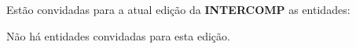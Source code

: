 
\begin{article}
	\label{art:convidadas}
	Estão convidadas para a atual edição da \textbf{INTERCOMP} as entidades:
	\begin{description}[noitemsep]
		\item Não há entidades convidadas para esta edição.
	\end{description}
\end{article}
